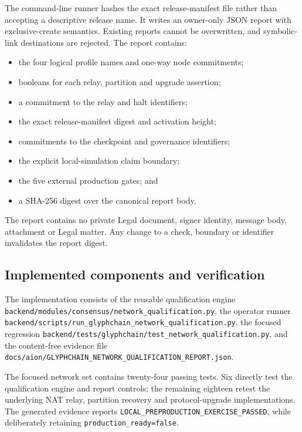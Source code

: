 The command-line runner hashes the exact release-manifest file rather than
accepting a descriptive release name.  It writes an owner-only JSON report with
exclusive-create semantics.  Existing reports cannot be overwritten, and
symbolic-link destinations are rejected.  The report contains:

\begin{itemize}
  \item the four logical profile names and one-way node commitments;
  \item booleans for each relay, partition and upgrade assertion;
  \item a commitment to the relay and halt identifiers;
  \item the exact release-manifest digest and activation height;
  \item commitments to the checkpoint and governance identifiers;
  \item the explicit local-simulation claim boundary;
  \item the five external production gates; and
  \item a SHA-256 digest over the canonical report body.
\end{itemize}

The report contains no private Legal document, signer identity, message body,
attachment or Legal matter.  Any change to a check, boundary or identifier
invalidates the report digest.

\subsection{Implemented components and verification}

The implementation consists of the reusable qualification engine
\texttt{backend/modules/consensus/network\_qualification.py}, the operator
runner \texttt{backend/scripts/run\_glyphchain\_network\_qualification.py},
the focused regression
\texttt{backend/tests/glyphchain/test\_network\_qualification.py}, and the
content-free evidence file
\texttt{docs/aion/GLYPHCHAIN\_NETWORK\_QUALIFICATION\_REPORT.json}.

The focused network set contains twenty-four passing tests.  Six directly test
the qualification engine and report controls; the remaining eighteen retest the
underlying NAT relay, partition recovery and protocol-upgrade implementations.
The generated evidence reports
\texttt{LOCAL\_PREPRODUCTION\_EXERCISE\_PASSED}, while deliberately retaining
\texttt{production\_ready=false}.

